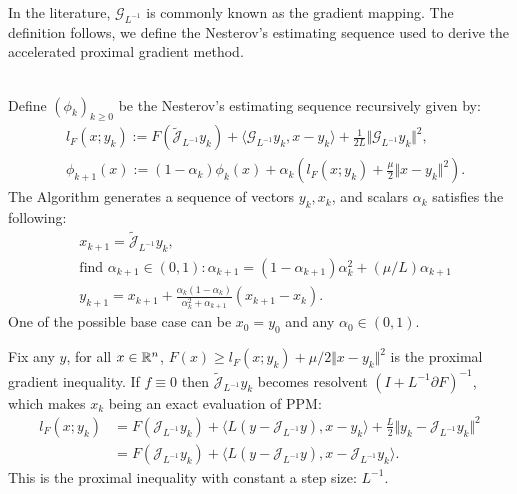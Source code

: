 \documentclass[12pt]{article}
\begin{document}
    In the literature, $\mathcal G_{L^{-1}}$ is commonly known as the gradient mapping. 
    The definition follows, we define the Nesterov's estimating sequence used to derive the accelerated proximal gradient method. 
    \begin{definition}
    \label{def:nes-est-seq-pg}\;\\
        Define $(\phi_k)_{k \ge0}$ be the Nesterov's estimating sequence recursively given by: 
        \begin{align*}
            & l_F(x; y_k) := 
                F\left(\widetilde{\mathcal J}_{L^{-1}} y_k \right) 
                + \langle \mathcal G_{L^{-1}}y_k, x - y_k\rangle + 
            \frac{1}{2L}\Vert \mathcal G_{L^{-1}}y_k\Vert^2, 
            \\
            & 
            \phi_{k + 1}(x)
            := (1 - \alpha_k)\phi_k (x) + 
            \alpha_k 
            \left(
                l_F(x; y_k) + \frac{\mu}{2}\Vert x - y_k\Vert^2
            \right). 
        \end{align*}
        The Algorithm generates a sequence of vectors $y_k, x_k$, and scalars $\alpha_k$ satisfies the following: 
        \begin{align*}
            &x_{k + 1} = \widetilde{\mathcal J}_{L^{-1}} y_k, 
            \\
            & \text{find } \alpha_{k + 1} \in (0, 1): 
            \alpha_{k + 1} = (1 - \alpha_{k + 1})\alpha_k^{2} + (\mu/L) \alpha_{k + 1}
            \\
            &y_{k + 1} = x_{k + 1} + \frac{\alpha_k(1 - \alpha_k)}{\alpha_k^2 + \alpha_{k + 1}}(x_{k + 1} - x_k). 
        \end{align*}
        One of the possible base case can be $x_0 = y_0$ and any $\alpha_0 \in (0, 1)$. 
    \end{definition}
    \begin{observation}
        Fix any $y$, for all $x\in \mathbb R^n$, $F(x) \ge l_F(x; y_k) + \mu/2\Vert x - y_k\Vert^2$ is the proximal gradient inequality. 
        If $f \equiv 0$ then $\widetilde{\mathcal J}_{L^{-1}}y_k$ becomes resolvent $(I + L^{-1}\partial F)^{-1}$, which makes $x_k$ being an exact evaluation of PPM: 
        \begin{align*}
            l_F(x; y_k) 
            &= F(\mathcal J_{L^{-1}}y_k) 
            + \langle L(y - \mathcal J_{L^{-1}} y), x - y_k\rangle + \frac{L}{2}\Vert y_k - \mathcal J_{L^{-1}}y_k\Vert^2
            \\
            &= F(\mathcal J_{L^{-1}}y_k) 
            + \langle L(y - \mathcal J_{L^{-1}} y), x - \mathcal J_{L^{-1}}y_k\rangle. 
        \end{align*}
        This is the proximal inequality with constant a step size: $L^{-1}$. 
    \end{observation}
\end{document}
